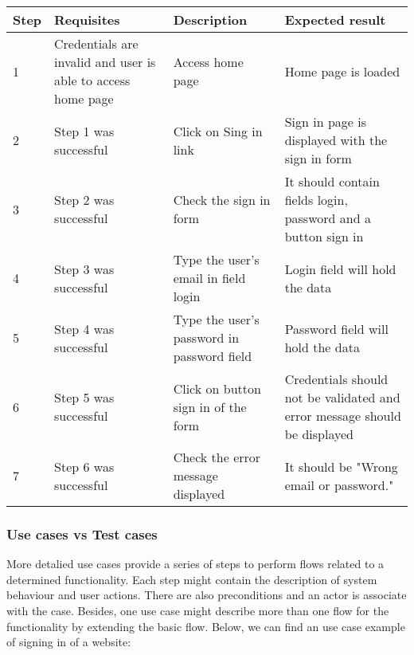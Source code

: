 \begin{center}
\begin{tabular}{| l | p{3cm} | p{5cm} | p{5cm} |}
\hline

Step & Requisites & Description & Expected result \\ \hline

1 & Credentials are invalid and user is able to access home page & Access home page & Home page is loaded\\ \hline

2 & Step 1 was successful & Click on Sing in link & Sign in page is displayed with the sign in form \\ \hline

3 & Step 2 was successful & Check the sign in form & It should contain fields login, password and a button sign in \\ \hline

4 & Step 3 was successful & Type the user's email in field login & Login field will hold the data\\ \hline

5 & Step 4 was successful & Type the user's password in password field & Password field will hold the data \\ \hline

6 & Step 5 was successful & Click on button sign in of the form & Credentials should not be validated and error message should be displayed \\ \hline

7 & Step 6 was successful & Check the error message displayed & It should be "Wrong email or password."\\

\hline
\end{tabular}

\end{center}



\subsubsection{Use cases vs Test cases}

More detalied use cases provide a series of steps to perform flows related to a determined functionality. Each step might contain the description of system behaviour and user actions. There are also preconditions and an actor is associate with the case. Besides, one use case might describe more than one flow for the functionality by extending the basic flow. Below, we can find an use case example of signing in of a website:


